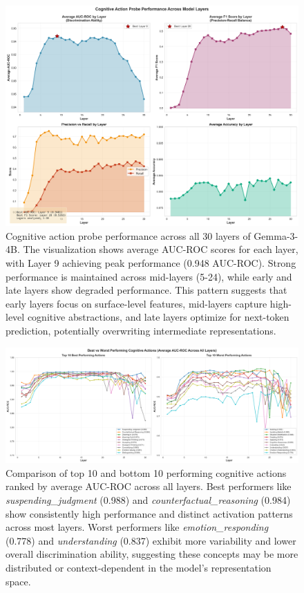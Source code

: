 \documentclass[letterpaper]{article}
\begin{document}
\begin{figure}[!htbp]
\centering
\includegraphics[width=\textwidth]{../data/cognitive_probe_performance_by_layer.png}
\caption{Cognitive action probe performance across all 30 layers of Gemma-3-4B. The visualization shows average AUC-ROC scores for each layer, with Layer 9 achieving peak performance (0.948 AUC-ROC). Strong performance is maintained across mid-layers (5-24), while early and late layers show degraded performance. This pattern suggests that early layers focus on surface-level features, mid-layers capture high-level cognitive abstractions, and late layers optimize for next-token prediction, potentially overwriting intermediate representations.}
\label{fig:layer_performance}
\end{figure}

\begin{figure}[!htbp]
\centering
\includegraphics[width=\textwidth]{../data/best_worst_actions.png}
\caption{Comparison of top 10 and bottom 10 performing cognitive actions ranked by average AUC-ROC across all layers. Best performers like \textit{suspending\_judgment} (0.988) and \textit{counterfactual\_reasoning} (0.984) show consistently high performance and distinct activation patterns across most layers. Worst performers like \textit{emotion\_responding} (0.778) and \textit{understanding} (0.837) exhibit more variability and lower overall discrimination ability, suggesting these concepts may be more distributed or context-dependent in the model's representation space.}
\label{fig:best_worst}
\end{figure}
\end{document}
